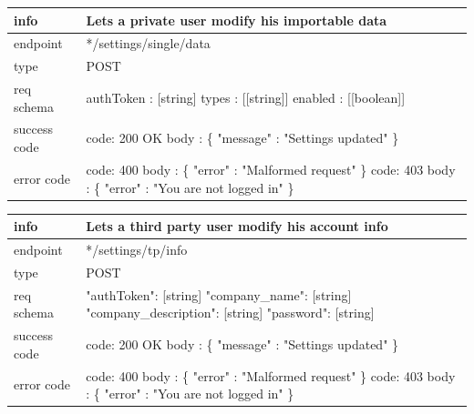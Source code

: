 \documentclass[titlepage]{article}
\begin{document}
\vspace{\baselineskip}

\begin{tabularx}{\textwidth}{lX} \hline
    info & Lets a private user modify his importable data \\ \hline
    endpoint & */settings/single/data \\ \hline
    type & POST \\ \hline
    req schema & 
        authToken : [string] \newline
        types : [[string]] \newline
        enabled : [[boolean]] \\ \hline
    success code &
        code: 200 OK \newline  
        body : \{ \newline
        "message" : "Settings updated" \newline
        \} \\ \hline
    error code &
        code: 400 \newline
        body : \{ "error" : "Malformed request" \} \newline \newline
        code: 403 \newline
        body : \{ "error" : "You are not logged in" \}\\  \hline
\end{tabularx}
		
\vspace{\baselineskip}

\begin{tabularx}{\textwidth}{lX} \hline
    info & Lets a third party user modify his account info \\ \hline
    endpoint & */settings/tp/info \\ \hline
    type & POST \\ \hline
    req schema & 
    "authToken": [string] \newline
    "company\_name": [string] \newline
    "company\_description": [string] \newline
    "password": [string] \\ \hline
    success code &
        code: 200 OK \newline  
        body : \{ \newline
        "message" : "Settings updated" \newline
        \} \\ \hline
    error code &
        code: 400 \newline
        body : \{ "error" : "Malformed request" \} \newline \newline
        code: 403 \newline
        body : \{ "error" : "You are not logged in" \} \\ \hline
\end{tabularx}
		
\end{document}
